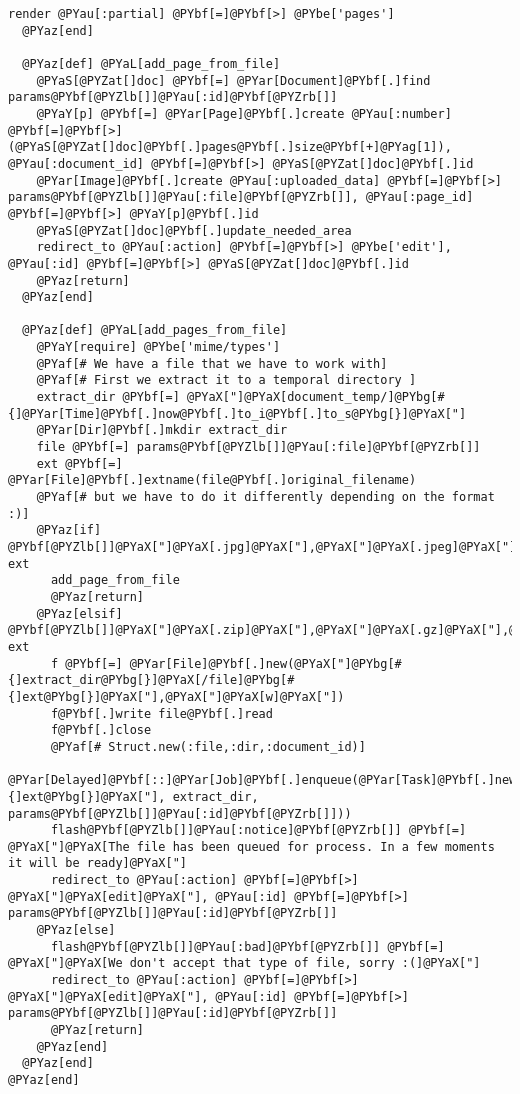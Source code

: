 \begin{Verbatim}[commandchars=@\[\]]
    render @PYau[:partial] @PYbf[=]@PYbf[>] @PYbe['pages']
  @PYaz[end]
  
  @PYaz[def] @PYaL[add_page_from_file]
    @PYaS[@PYZat[]doc] @PYbf[=] @PYar[Document]@PYbf[.]find params@PYbf[@PYZlb[]]@PYau[:id]@PYbf[@PYZrb[]]
    @PYaY[p] @PYbf[=] @PYar[Page]@PYbf[.]create @PYau[:number] @PYbf[=]@PYbf[>] (@PYaS[@PYZat[]doc]@PYbf[.]pages@PYbf[.]size@PYbf[+]@PYag[1]), @PYau[:document_id] @PYbf[=]@PYbf[>] @PYaS[@PYZat[]doc]@PYbf[.]id
    @PYar[Image]@PYbf[.]create @PYau[:uploaded_data] @PYbf[=]@PYbf[>] params@PYbf[@PYZlb[]]@PYau[:file]@PYbf[@PYZrb[]], @PYau[:page_id] @PYbf[=]@PYbf[>] @PYaY[p]@PYbf[.]id
    @PYaS[@PYZat[]doc]@PYbf[.]update_needed_area
    redirect_to @PYau[:action] @PYbf[=]@PYbf[>] @PYbe['edit'], @PYau[:id] @PYbf[=]@PYbf[>] @PYaS[@PYZat[]doc]@PYbf[.]id
    @PYaz[return]
  @PYaz[end]
  
  @PYaz[def] @PYaL[add_pages_from_file]
    @PYaY[require] @PYbe['mime/types']
    @PYaf[# We have a file that we have to work with]
    @PYaf[# First we extract it to a temporal directory ]
    extract_dir @PYbf[=] @PYaX["]@PYaX[document_temp/]@PYbg[#{]@PYar[Time]@PYbf[.]now@PYbf[.]to_i@PYbf[.]to_s@PYbg[}]@PYaX["]
    @PYar[Dir]@PYbf[.]mkdir extract_dir
    file @PYbf[=] params@PYbf[@PYZlb[]]@PYau[:file]@PYbf[@PYZrb[]]
    ext @PYbf[=] @PYar[File]@PYbf[.]extname(file@PYbf[.]original_filename)
    @PYaf[# but we have to do it differently depending on the format :)]
    @PYaz[if] @PYbf[@PYZlb[]]@PYaX["]@PYaX[.jpg]@PYaX["],@PYaX["]@PYaX[.jpeg]@PYaX["],@PYaX["]@PYaX[.gif]@PYaX["],@PYaX["]@PYaX[.png]@PYaX["]@PYbf[@PYZrb[]]@PYbf[.]include? ext
      add_page_from_file
      @PYaz[return]
    @PYaz[elsif] @PYbf[@PYZlb[]]@PYaX["]@PYaX[.zip]@PYaX["],@PYaX["]@PYaX[.gz]@PYaX["],@PYaX["]@PYaX[.rar]@PYaX["],@PYaX["]@PYaX[.pdf]@PYaX["]@PYbf[@PYZrb[]]@PYbf[.]include? ext
      f @PYbf[=] @PYar[File]@PYbf[.]new(@PYaX["]@PYbg[#{]extract_dir@PYbg[}]@PYaX[/file]@PYbg[#{]ext@PYbg[}]@PYaX["],@PYaX["]@PYaX[w]@PYaX["])
      f@PYbf[.]write file@PYbf[.]read
      f@PYbf[.]close
      @PYaf[# Struct.new(:file,:dir,:document_id)]
      @PYar[Delayed]@PYbf[::]@PYar[Job]@PYbf[.]enqueue(@PYar[Task]@PYbf[.]new(@PYaX["]@PYaX[file]@PYbg[#{]ext@PYbg[}]@PYaX["], extract_dir, params@PYbf[@PYZlb[]]@PYau[:id]@PYbf[@PYZrb[]]))
      flash@PYbf[@PYZlb[]]@PYau[:notice]@PYbf[@PYZrb[]] @PYbf[=] @PYaX["]@PYaX[The file has been queued for process. In a few moments it will be ready]@PYaX["]
      redirect_to @PYau[:action] @PYbf[=]@PYbf[>] @PYaX["]@PYaX[edit]@PYaX["], @PYau[:id] @PYbf[=]@PYbf[>] params@PYbf[@PYZlb[]]@PYau[:id]@PYbf[@PYZrb[]]
    @PYaz[else]
      flash@PYbf[@PYZlb[]]@PYau[:bad]@PYbf[@PYZrb[]] @PYbf[=] @PYaX["]@PYaX[We don't accept that type of file, sorry :(]@PYaX["]
      redirect_to @PYau[:action] @PYbf[=]@PYbf[>] @PYaX["]@PYaX[edit]@PYaX["], @PYau[:id] @PYbf[=]@PYbf[>] params@PYbf[@PYZlb[]]@PYau[:id]@PYbf[@PYZrb[]]
      @PYaz[return]
    @PYaz[end]
  @PYaz[end]
@PYaz[end]
\end{Verbatim}


